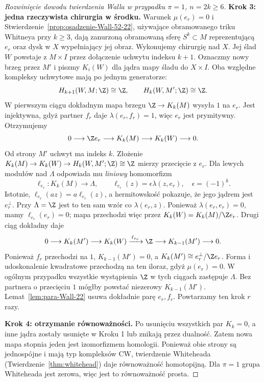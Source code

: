 \begin{proof}[Rozwinięcie dowodu twierdzenia Walla w przypadku
 $\pi=1$, $n=2k\geq6$]
\textbf{Krok 3: jedna rzeczywista chirurgia
w środku.}
Warunek $\mu(e_r)=0$ i
Stwierdzenie~\ref{prop:osadzenie-Wall-52-22},
używające obramowanego triku Whitneya
przy $k\geq3$, dają zanurzoną obramowaną
sferę $S^k\subset M$ reprezentującą $e_r$
oraz dysk w $X$ wypełniający jej obraz.
Wykonujemy chirurgię nad $X$.
Jej ślad $W$ powstaje z $M\times I$
przez dołączenie uchwytu indeksu $k+1$.
Oznaczmy nowy brzeg przez $M'$ i piszmy
$K_i(W)$ dla jądra mapy śladu do $X\times I$.
Oba względne kompleksy uchwytowe mają po
jednym generatorze:
\[
 H_{k+1}(W,M;\Z)\cong\Z,\qquad
 H_k(W,M';\Z)\cong\Z.
\]
W pierwszym ciągu dokładnym mapa brzegu
$\Z\to K_k(M)$ wysyła $1$ na $e_r$.
Jest injektywna, gdyż partner $f_r$ daje
$\lambda(e_r,f_r)=1$, więc $e_r$ jest
prymitywny. Otrzymujemy
\[
 0\longrightarrow\Z e_r\longrightarrow K_k(M)
 \longrightarrow K_k(W)\longrightarrow0.
\]
Od strony $M'$ uchwyt ma indeks $k$.
Złożenie $K_k(M)\to K_k(W)\to
H_k(W,M';\Z)\cong\Z$ mierzy przecięcie
z $e_r$. Dla lewych modułów nad
$\Lambda$ odpowiada mu \emph{liniowy}
homomorfizm
\[
 \ell_{e_r}:K_k(M)\longrightarrow\Lambda,
 \qquad \ell_{e_r}(z)=\epsilon\lambda(z,e_r),
 \quad \epsilon=(-1)^k.
\]
Istotnie, $\ell_{e_r}(az)=a\ell_{e_r}(z)$,
a hermitowskość pokazuje, że jego jądrem
jest $e_r^\perp$. Przy $\Lambda=\Z$ jest to
ten sam wzór co $\lambda(e_r,z)$.
Ponieważ $\lambda(e_r,e_r)=0$, mamy
$\ell_{e_r}(e_r)=0$; mapa przechodzi więc
przez $K_k(W)=K_k(M)/\Z e_r$.
Drugi ciąg dokładny daje
\[
 0\longrightarrow K_k(M')\longrightarrow K_k(W)
 \xrightarrow{\,\ell_{e_r}\,}\Z
 \longrightarrow K_{k-1}(M')\longrightarrow0.
\]
Ponieważ $f_r$ przechodzi na $1$,
$K_{k-1}(M')=0$, a
$K_k(M')\cong e_r^\perp/\Z e_r$.
Forma i udoskonalenie kwadratowe przechodzą
na ten iloraz, gdyż $\mu(e_r)=0$.
W ogólnym przypadku wszystkie wystąpienia
$\Z$ w tych ciągach zastępuje $\Lambda$.
Bez partnera o przecięciu $1$ mógłby
powstać niezerowy $K_{k-1}(M')$.
Lemat~\ref{lem:para-Wall-22} usuwa dokładnie
parę $e_r,f_r$. Powtarzamy ten krok $r$ razy.

\textbf{Krok 4: otrzymanie równoważności.}
Po usunięciu wszystkich par $K_k=0$,
a inne jądra zostały usunięte w Kroku 1
lub znikają przez dualność. Zatem nowa
mapa stopnia jeden jest izomorfizmem
homologii. Ponieważ obie strony są
jednospójne i mają typ kompleksów CW,
twierdzenie Whiteheada
(Twierdzenie~\ref{thm:whitehead})
daje równoważność homotopijną.
Dla $\pi=1$ grupa Whiteheada jest zerowa,
więc jest to równoważność prosta.


\end{proof}
